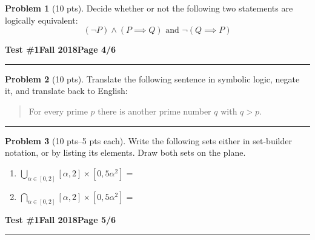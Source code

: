 \documentclass[11pt]{article}
\theoremstyle{definition}
\newtheorem{problem}{Problem}
\begin{document}
\begin{problem}[10 pts]
  Decide whether or not the following two statements are logically equivalent:
  \begin{equation*}
    (\lnot P) \land (P \implies Q) \text{ and } \lnot ( Q \implies P)
  \end{equation*}

  \vspace{3cm}
\end{problem}
\newpage

\hfill{\large\bf Test \#1}\hfill{\large\bf Fall 2018}\hfill{\large\bf Page 4/6}\hrule

\bigskip

\begin{problem}[10 pts]
  Translate the following sentence in symbolic logic, negate it, and translate back to English:
  \begin{quote}
    For every prime $p$ there is another prime number $q$ with $q > p$.
  \end{quote}

  \vspace{4cm}
\end{problem}
\hrule

\begin{problem}[10 pts--5 pts each]
  Write the following sets either in set-builder notation, or by listing its elements.  Draw both sets on the plane.
  \begin{enumerate}
  \item $\displaystyle{\bigcup_{\alpha \in [0,2]}[\alpha,2] \times [0,5\alpha^2]=}$
  \item $\displaystyle{\bigcap_{\alpha \in [0,2]}[\alpha,2] \times [0,5\alpha^2]=}$
  \end{enumerate}

  \vspace{8cm}
\end{problem}
\newpage

\hfill{\large\bf Test \#1}\hfill{\large\bf Fall 2018}\hfill{\large\bf Page 5/6}\hrule

\bigskip
\end{document}
